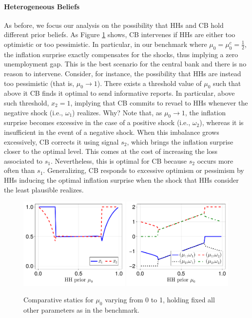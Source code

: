 \documentclass[12pt,a4paper]{article}
\begin{document}
\paragraph{Heterogeneous Beliefs}
As before, we focus our analysis on the possibility that HHs and CB hold different prior beliefs. As Figure \ref{Figure3} shows, CB intervenes if HHs are either too optimistic or too pessimistic. In particular, in our benchmark where $\mu_0=\mu_0^c=\frac{1}{2}$, the inflation surprise exactly compensates for the shocks, thus implying a zero unemployment gap. This is the best scenario for the central bank and there is no reason to intervene. Consider, for instance, the possibility that HHs are instead too pessimistic (that is, $\mu_0\to 1$). There exists a threshold value of $\mu_0$ such that above it CB finds it optimal to send informative reports. In particular, above such threshold, $x_2=1$, implying that CB commits to revael to HHs whenever the negative shock (i.e., $\omega_1$) realizes. Why? Note that, as $\mu_0\to 1$, the inflation surprise becomes excessive in the case of a positive shock (i.e., $\omega_2$), whereas it is insufficient in the event of a negative shock. When this imbalance grows excessively, CB corrects it using signal $s_2$, which brings the inflation surprise closer to the optimal level. This comes at the cost of increasing the loss associated to $s_1$. Nevertheless, this is optimal for CB because $s_2$ occurs more often than $s_1$. Generalizing, CB responds to excessive optimism or pessimism by HHs inducing the optimal inflation surprise when the shock that HHs consider the least plausible realizes.

\begin{figure}[H]
\centering
\includegraphics[width=0.49\textwidth]{figures/V8/γ_1/fig_optimal_π_across_μ_0_ω_1_1_ω_2_-1_δ_0.5_.pdf}
\includegraphics[width=0.49\textwidth]{figures/V8/γ_1/fig_posterior_across_μ_0_ω_1_1_ω_2_-1_δ_0.5_.pdf}
\caption{Comparative statics for $\mu_0$ varying from 0 to 1, holding fixed all other parameters as in the benchmark.}
\label{Figure3}
\end{figure}
\end{document}

